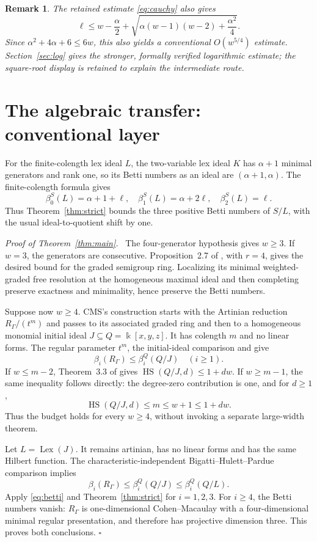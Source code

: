 \documentclass[11pt,a4paper]{article}
\newtheorem{remark}[theorem]{Remark}
\newenvironment{proof}[1][Proof]{\par\noindent\textit{#1.}\ \ignorespaces}{\unskip\nobreak\hfill\ensuremath{\square}\par}
\newcommand{\kk}{\Bbbk}
\newcommand{\HS}{\operatorname{HS}}
\newcommand{\Lex}{\operatorname{Lex}}
\begin{document}
\begin{remark}
The retained estimate \eqref{eq:cauchy} also gives
\[
 \ell\le w-\frac\alpha2+
   \sqrt{\alpha(w-1)(w-2)+\frac{\alpha^2}{4}}.
\]
Since $\alpha^2+4\alpha+6\le6w$, this also yields a conventional $O(w^{5/4})$ estimate. Section~\ref{sec:log} gives the stronger, formally verified logarithmic estimate; the square-root display is retained to explain the intermediate route.
\end{remark}

\section{The algebraic transfer: conventional layer}
For the finite-colength lex ideal $L$, the two-variable lex ideal $K$ has $\alpha+1$ minimal generators and rank one, so its Betti numbers as an ideal are $(\alpha+1,\alpha)$. The finite-colength formula \cite[equation~(7)]{CMS} gives
\begin{equation}\label{eq:betti}
 \beta_0^S(L)=\alpha+1+\ell,\quad
 \beta_1^S(L)=\alpha+2\ell,\quad
 \beta_2^S(L)=\ell.
\end{equation}
Thus Theorem~\ref{thm:strict} bounds the three positive Betti numbers of $S/L$, with the usual ideal-to-quotient shift by one.

\begin{proof}[Proof of Theorem~\ref{thm:main}]
The four-generator hypothesis gives $w\ge3$. If $w=3$, the generators are consecutive. Proposition~2.7 of \cite{HS}, with $r=4$, gives the desired bound for the graded semigroup ring. Localizing its minimal weighted-graded free resolution at the homogeneous maximal ideal and then completing preserve exactness and minimality, hence preserve the Betti numbers.

Suppose now $w\ge4$. CMS's construction starts with the Artinian reduction $R_\Gamma/(t^m)$ and passes to its associated graded ring and then to a homogeneous monomial initial ideal $J\subseteq Q=\kk[x,y,z]$. It has colength $m$ and no linear forms. The regular parameter $t^m$, the initial-ideal comparison and \cite[equation~(1)]{CMS} give
\[
 \beta_i(R_\Gamma)\le\beta_i^Q(Q/J)\quad(i\ge1).
\]
If $w\le m-2$, Theorem~3.3 of \cite{CMS} gives $\HS(Q/J,d)\le1+dw$. If $w\ge m-1$, the same inequality follows directly: the degree-zero contribution is one, and for $d\ge1$,
\[
 \HS(Q/J,d)\le m\le w+1\le1+dw.
\]
Thus the budget holds for every $w\ge4$, without invoking a separate large-width theorem.

Let $L=\Lex(J)$. It remains artinian, has no linear forms and has the same Hilbert function. The characteristic-independent Bigatti--Hulett--Pardue comparison \cite[Theorem~2.1]{CMS} implies
\[
 \beta_i(R_\Gamma)\le\beta_i^Q(Q/J)\le\beta_i^Q(Q/L).
\]
Apply \eqref{eq:betti} and Theorem~\ref{thm:strict} for $i=1,2,3$. For $i\ge4$, the Betti numbers vanish: $R_\Gamma$ is one-dimensional Cohen--Macaulay with a four-dimensional minimal regular presentation, and therefore has projective dimension three. This proves both conclusions.
\end{proof}
\end{document}
